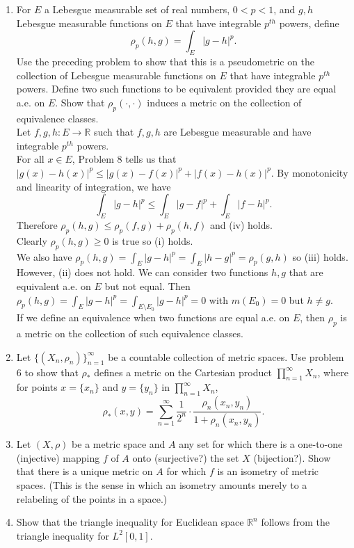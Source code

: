\begin{enumerate}
    \item For $E$ a Lebesgue measurable set of real numbers, $0<p<1$, and $g,h$ Lebesgue measurable functions on $E$ that have integrable $p^{th}$ powers, define
    \[
    \rho_p(h,g)=\int_E|g-h|^p.    
    \]  
    Use the preceding problem to show that this is a pseudometric on the collection of Lebesgue measurable functions on $E$ that have integrable $p^{th}$ powers.
    Define two such functions to be equivalent provided they are equal a.e. on $E$. 
    Show that $\rho_p(\cdot,\cdot)$ induces a metric on the collection of equivalence classes.
    \\Let $f,g,h:E\to\mathbb{R}$ such that $f,g,h$ are Lebesgue measurable and have integrable $p^{th}$ powers. 
    \\For all $x\in E$, Problem 8 tells us that $|g(x)-h(x)|^p\le|g(x)-f(x)|^p+|f(x)-h(x)|^p$.
    By monotonicity and linearity of integration, we have
    \[
        \int_E|g-h|^p\le\int_E|g-f|^p+\int_E|f-h|^p.
    \]
    Therefore $\rho_p(h,g)\le\rho_p(f,g)+\rho_p(h,f)$ and (iv) holds.\\
    Clearly $\rho_p(h,g)\ge0$ is true so (i) holds.\\
    We also have $\rho_p(h,g)=\int_E|g-h|^p=\int_E|h-g|^p=\rho_p(g,h)$ so (iii) holds.\\
    However, (ii) does not hold. We can consider two functions $h,g$ that are equivalent a.e. on $E$ but not equal.
    Then $ \rho_p(h,g)=\int_E|g-h|^p= \int_{E\setminus E_0}|g-h|^p=0$ with $m(E_0)=0$ but $h\neq g$.\\
    If we define an equivalence when two functions are equal a.e. on $E$, then $\rho_p$ is a metric on the collection of such equivalence classes. 
    \item Let $\{(X_n,\rho_n)\}_{n=1}^\infty$ be a countable collection of metric spaces.
    Use problem 6 to show that $\rho_*$ defines a metric on the Cartesian product $\prod_{n=1}^\infty X_n$, where for points $x = \{x_n\}$ and $y= \{y_n\}$ in $\prod_{n=1}^\infty X_n$,
    \[
    \rho_*(x,y)=\sum_{n=1}^\infty\frac{1}{2^n}\cdot\frac{\rho_n(x_n,y_n)}{1+\rho_n(x_n,y_n)}.    
    \]
    \item Let $(X,\rho)$ be a metric space and $A$ any set for which there is a one-to-one (injective) mapping $f$ of $A$ onto (surjective?) the set $X$ (bijection?).
    Show that there is a unique metric on $A$ for which $f$ is an isometry of metric spaces.
    (This is the sense in which an isometry amounts merely to a relabeling of the points in a space.)
    \item Show that the triangle inequality for Euclidean space $\mathbb{R}^n$ follows from the triangle inequality for $L^2[0,1]$.
\end{enumerate}

